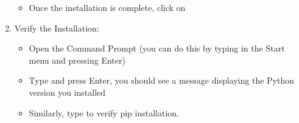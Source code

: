 \documentclass[letterpaper,10pt,english]{jupyterBook}
\begin{document}
\begin{enumerate}
\begin{itemize}
\item {} 
\sphinxAtStartPar
Once the installation is complete, click on 

\end{itemize}

\item {} 
\sphinxAtStartPar
Verify the Installation:
\begin{itemize}
\item {} 
\sphinxAtStartPar
Open the Command Prompt (you can do this by typing  in the Start menu and pressing Enter)

\item {} 
\sphinxAtStartPar
Type  and press Enter, you should see a message displaying the Python version you installed

\item {} 
\sphinxAtStartPar
Similarly, type  to verify pip installation.

\end{itemize}

\end{enumerate}
\end{document}
